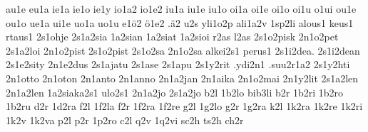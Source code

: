 {au1e
eu1a
ie1a
ie1o
ie1y
io1a2
io1e2
iu1a
iu1e
iu1o
oi1a
oi1e
oi1o
oi1u
o1ui %
ou1e
ou1o
ue1a
ui1e
uo1a
uo1u
e1^^f62
^^f61e2
.^^e42     %
%
%
u2s         %
yli1o2p     %
ali1a2v     %
1sp2li      %
alous1
keus1       %
rtaus1
2s1ohje     %
2s1a2sia    %
1a2sian     %
1a2siat     %
1a2sioi     %
r2as l2as   %
2s1o2pisk   %
2n1o2pet
2s1a2loi
2n1o2pist    %
2s1o2pist
2s1o2sa      %
2n1o2sa      %
alkei2s1
perus1
2s1i2dea. 2s1i2dean
2s1e2sity    %
2n1e2dus     %
2s1ajatu     %
2s1ase
2s1apu
2s1y2rit     %
.ydi2n1
.suu2r1a2    %
2s1y2hti
2n1otto 2n1oton
2n1anto 2n1anno
2n1a2jan 2n1aika
2n1o2mai
2n1y2lit
2s1a2len
2n1a2len
1a2siaka2s1
ulo2s1        %
2n1a2jo       %
2s1a2jo
%
%
%
b2l 1b2lo bib3li
b2r 1b2ri 1b2ro 1b2ru
d2r 1d2ra
f2l 1f2la
f2r 1f2ra 1f2re
g2l 1g2lo
g2r 1g2ra
k2l
1k2ra 1k2re 1k2ri
1k2v 1k2va
p2l
p2r 1p2ro
c2l
q2v 1q2vi
sc2h ts2h
ch2r
}
\endgroup
\endinput
